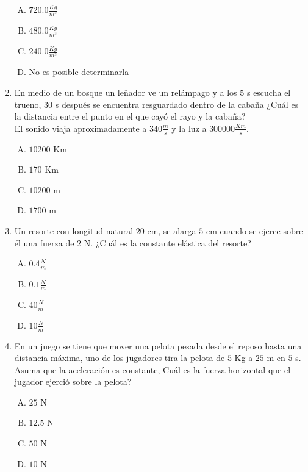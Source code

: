 \begin{enumerate}
\begin{enumerate}[(A)]
\item $720.0\frac{Kg}{m^3}$
\item $480.0\frac{Kg}{m^3}$
\item $240.0\frac{Kg}{m^3}$
\item No es posible determinarla
\end{enumerate}

\item En medio de un bosque un leñador ve un relámpago y a los $5$ s escucha el trueno, $30$ s después se encuentra resguardado dentro de la cabaña ¿Cuál es la distancia entre el punto en el que cayó el rayo y la cabaña?\label{dia-20}\\
El sonido viaja aproximadamente a $340\frac{m}{s}$ y la luz a $300000\frac{Km}{s}$. 

\begin{enumerate}[(A)]
\item $10200$ Km
\item $170$ Km
\item $10200$ m
\item $1700$ m
\end{enumerate}


\item Un resorte con longitud natural $20$ cm, se alarga $5$ cm cuando se ejerce sobre él una fuerza de $2$ N. ¿Cuál es la constante elástica del resorte? \label{dia-21}

\begin{enumerate}[(A)]
\item $0.4\frac{N}{m}$
\item $0.1\frac{N}{m}$
\item $40\frac{N}{m}$
\item $10\frac{N}{m}$
\end{enumerate}

\item En un juego se tiene que mover una pelota pesada desde el reposo hasta una distancia máxima, uno de los jugadores tira la pelota de $5$ Kg a $25$ m en $5$ s. Asuma que la aceleración es constante, Cuál es la fuerza horizontal que el jugador ejerció sobre la pelota? \label{dia-22}

\begin{enumerate}[(A)]
\item $25$ N
\item $12.5$ N
\item $50$ N
\item $10$ N
\end{enumerate}


\end{enumerate}
